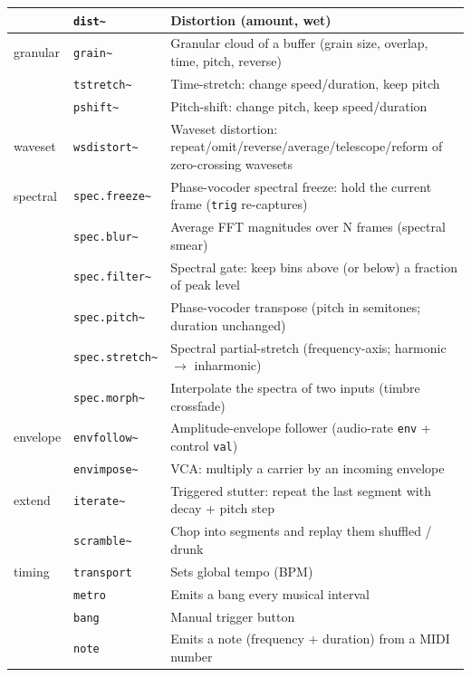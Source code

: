 \documentclass[11pt,letterpaper]{article}
\begin{document}
{\begin{longtable}{@{}llp{7.4cm}@{}}
         & \texttt{dist\~{}}   & Distortion (amount, wet) \\
\midrule
granular & \texttt{grain\~{}}    & Granular cloud of a buffer (grain size, overlap, time, pitch, reverse) \\
         & \texttt{tstretch\~{}} & Time-stretch: change speed/duration, keep pitch \\
         & \texttt{pshift\~{}}   & Pitch-shift: change pitch, keep speed/duration \\
\midrule
waveset  & \texttt{wsdistort\~{}} & Waveset distortion: repeat/omit/reverse/average/telescope/reform of zero-crossing wavesets \\
\midrule
spectral & \texttt{spec.freeze\~{}}  & Phase-vocoder spectral freeze: hold the current frame (\texttt{trig} re-captures) \\
         & \texttt{spec.blur\~{}}    & Average FFT magnitudes over N frames (spectral smear) \\
         & \texttt{spec.filter\~{}}  & Spectral gate: keep bins above (or below) a fraction of peak level \\
         & \texttt{spec.pitch\~{}}   & Phase-vocoder transpose (pitch in semitones; duration unchanged) \\
         & \texttt{spec.stretch\~{}} & Spectral partial-stretch (frequency-axis; harmonic $\to$ inharmonic) \\
         & \texttt{spec.morph\~{}}   & Interpolate the spectra of two inputs (timbre crossfade) \\
\midrule
envelope & \texttt{envfollow\~{}} & Amplitude-envelope follower (audio-rate \texttt{env} + control \texttt{val}) \\
         & \texttt{envimpose\~{}} & VCA: multiply a carrier by an incoming envelope \\
\midrule
extend   & \texttt{iterate\~{}}  & Triggered stutter: repeat the last segment with decay + pitch step \\
         & \texttt{scramble\~{}} & Chop into segments and replay them shuffled / drunk \\
\midrule
timing   & \texttt{transport} & Sets global tempo (BPM) \\
         & \texttt{metro}     & Emits a bang every musical interval \\
         & \texttt{bang}      & Manual trigger button \\
         & \texttt{note}      & Emits a note (frequency + duration) from a MIDI number \\

\end{longtable}}
\end{document}
